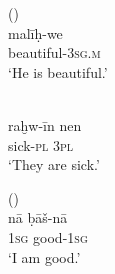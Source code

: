 \documentclass[output=paper]{langsci/langscibook}
\begin{document}
\begin{exe}
\ex \label{copt}
		\begin{xlist}
		\ex {}  (\citealt[131]{Jastrow1978}) \\\label{copkr}\gll malī\d{h}-we		\\
    beautiful-\textsc{3sg.m} \\
       \glt `He is beautiful.'

	\ex {}  \\
	\label{copts} \gll raḫw-īn nen\\
	sick-\textsc{pl} \textsc{3pl}\\
        \glt  `They are sick.'

		\ex {}  (\citealt[40]{Jastrow1973})\\ \label{coparam} \gll  nā ḅāš-nā\\
		\textsc{1sg} good-\textsc{1sg}\\
      \glt  `I am good.'
        \end{xlist}

\end{exe}





\end{document}
